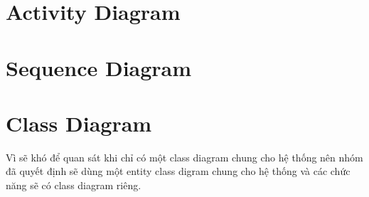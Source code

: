 \documentclass[a4paper]{article}
\begin{document}



\newpage


\newpage

\newpage



\newpage
\section{Activity Diagram}





\newpage
\section{Sequence Diagram}


\newpage





\newpage
\section{Class Diagram}

Vì sẽ khó để quan sát khi chỉ có một class diagram chung cho hệ thống  nên nhóm đã quyết định sẽ dùng một entity class digram chung cho hệ thống và các chức năng sẽ có class diagram riêng.
\end{document}
